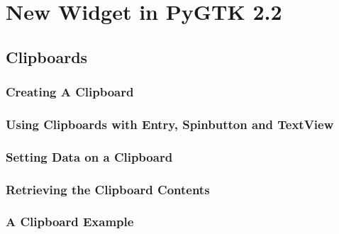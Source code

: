 \chapter{New Widget in PyGTK 2.2}
\section{Clipboards}
\subsection{Creating A Clipboard}
\subsection{Using Clipboards with Entry, Spinbutton and TextView}
\subsection{Setting Data on a Clipboard}
\subsection{Retrieving the Clipboard Contents}
\subsection{A Clipboard Example}
